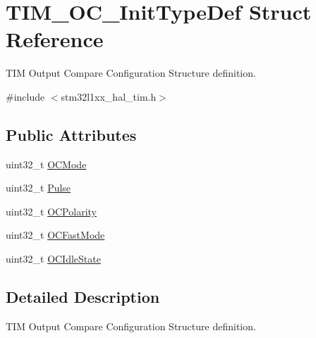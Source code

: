 \hypertarget{struct_t_i_m___o_c___init_type_def}{\section{T\-I\-M\-\_\-\-O\-C\-\_\-\-Init\-Type\-Def Struct Reference}
\label{struct_t_i_m___o_c___init_type_def}
}


T\-I\-M Output Compare Configuration Structure definition.  




{\ttfamily \#include $<$stm32l1xx\-\_\-hal\-\_\-tim.\-h$>$}

\subsection*{Public Attributes}
\begin{DoxyCompactItemize}
\item 
uint32\-\_\-t \hyperlink{struct_t_i_m___o_c___init_type_def_ae5faa1cba0b3f1ab6179cc54e1015ee8}{O\-C\-Mode}
\item 
uint32\-\_\-t \hyperlink{struct_t_i_m___o_c___init_type_def_a61fb5b9ef4154de67620ac81085a0e39}{Pulse}
\item 
uint32\-\_\-t \hyperlink{struct_t_i_m___o_c___init_type_def_a556b7137d041aceed3e45c87cbfb39cd}{O\-C\-Polarity}
\item 
uint32\-\_\-t \hyperlink{struct_t_i_m___o_c___init_type_def_a4c4203c5ed779ac86fb793bb9d628e55}{O\-C\-Fast\-Mode}
\item 
uint32\-\_\-t \hyperlink{struct_t_i_m___o_c___init_type_def_ace3e2b76ca2fca0f4961585ed9ebecf5}{O\-C\-Idle\-State}
\end{DoxyCompactItemize}


\subsection{Detailed Description}
T\-I\-M Output Compare Configuration Structure definition. 

